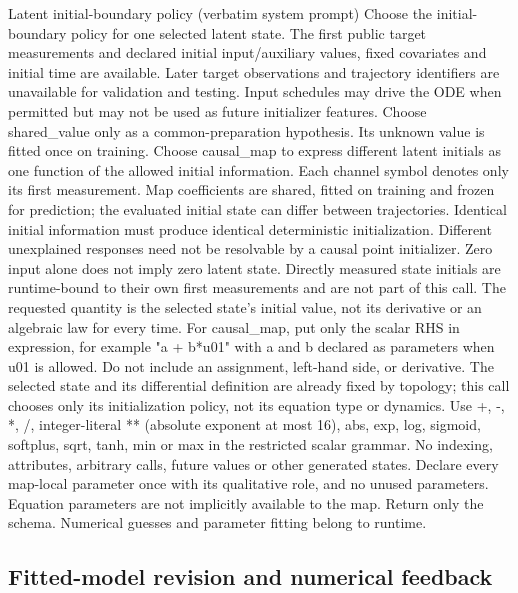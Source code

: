 \begin{afpromptbox}{Latent initial-boundary policy (verbatim system prompt)}
Choose the initial-boundary policy for one selected latent state. The first
public target measurements and declared initial input/auxiliary values,
fixed covariates and initial time are available. Later target observations
and trajectory identifiers are unavailable for validation and testing. Input
schedules may drive the ODE when permitted but may not be used as future
initializer features. Choose shared_value only as a common-preparation
hypothesis. Its unknown value is fitted once on training. Choose causal_map
to express different latent initials as one function of the allowed initial
information. Each channel symbol denotes only its first measurement. Map
coefficients are shared, fitted on training and frozen for prediction; the
evaluated initial state can differ between trajectories. Identical initial
information must produce identical deterministic initialization. Different
unexplained responses need not be resolvable by a causal point initializer.
Zero input alone does not imply zero latent state. Directly measured state
initials are runtime-bound to their own first measurements and are not part
of this call. The requested quantity is the selected state's initial value,
not its derivative or an algebraic law for every time. For causal_map, put
only the scalar RHS in expression, for example "a + b*u01" with a and b
declared as parameters when u01 is allowed. Do not include an assignment,
left-hand side, or derivative. The selected state and its differential
definition are already fixed by topology; this call chooses only its
initialization policy, not its equation type or dynamics. Use +, -, *, /,
integer-literal ** (absolute exponent at most 16), abs, exp, log, sigmoid,
softplus, sqrt, tanh, min or max in the restricted scalar grammar. No
indexing, attributes, arbitrary calls, future values or other generated
states. Declare every map-local parameter once with its qualitative role,
and no unused parameters. Equation parameters are not implicitly available
to the map. Return only the schema. Numerical guesses and parameter fitting
belong to runtime.
\end{afpromptbox}

\subsection{Fitted-model revision and numerical feedback}

